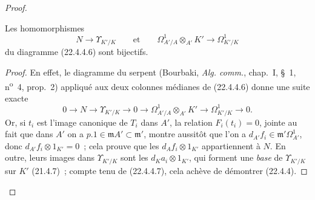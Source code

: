 \begin{proof}
\begin{lemma}[22.4.4.7]
\label{0.22.4.4.7-fr}
Les homomorphismes
\[
  N\longrightarrow\Upsilon_{K'/K}\qquad\text{et}\qquad
  \Omega^1_{A'/A}\otimes_{A'}K'\longrightarrow\Omega^1_{K'/K}
\]
du diagramme \textup{(22.4.4.6)} sont bijectifs.
\end{lemma}

\begin{proof}
En effet, le diagramme du serpent (Bourbaki, \emph{Alg. comm.}, chap.~I,
§~1, n\textsuperscript{o}~4, prop.~2) appliqué aux deux colonnes médianes de
(22.4.4.6) donne une suite exacte
\[
  0\longrightarrow N\longrightarrow\Upsilon_{K'/K}\longrightarrow0
  \longrightarrow\Omega^1_{A'/A}\otimes_{A'}K'
  \longrightarrow\Omega^1_{K'/K}\longrightarrow0.
\]
Or, si $t_i$ est l'image canonique de $T_i$ dans $A'$, la relation
$F_i(t_i)=0$, jointe au fait que dans $A'$ on a
$p.1\in\mathfrak mA'\subset\mathfrak m'$, montre aussitôt que l'on a
$d_{A'}f_i\in\mathfrak m'\Omega^1_{A'}$, donc
$d_{A'}f_i\otimes1_{K'}=0$~; cela prouve que les
$d_Af_i\otimes1_{K'}$ appartiennent à $N$. En outre, leurs images dans
$\Upsilon_{K'/K}$ sont les $d_Ka_i\otimes1_{K'}$, qui forment une \emph{base} de
$\Upsilon_{K'/K}$ sur $K'$ (21.4.7)~; compte tenu de (22.4.4.7), cela achève
de démontrer (22.4.4).
\end{proof}
\end{proof}
